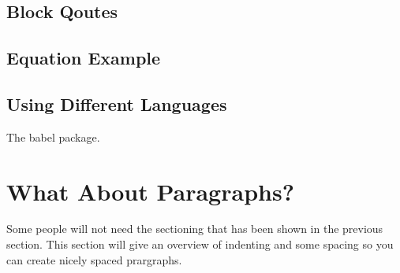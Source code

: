 \documentclass[./dissertation.tex]{subfiles}
\begin{document}
      \subsection{Block Qoutes}
      \subsection{Equation Example}


      \subsection{Using Different Languages}
      The babel package.

      \section{What About Paragraphs?}
      Some people will not need the sectioning that has been shown in the previous section. This section will give an overview of indenting and some spacing so you can create nicely spaced prargraphs.
\end{document}
